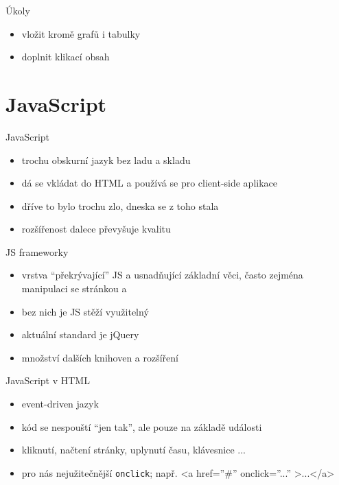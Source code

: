 \documentclass{beamer}
\begin{document}
\begin{frame}{Úkoly}
  \begin{itemize}
    \item vložit kromě grafů i tabulky
    \item doplnit klikací obsah
  \end{itemize}
\end{frame}


\section{JavaScript}

\begin{frame}{JavaScript}
  \begin{itemize}
    \item trochu obskurní jazyk bez ladu a skladu
    \item dá se vkládat do HTML a používá se pro client-side aplikace
    \item dříve to bylo trochu zlo, dneska se z toho stala
    \item rozšířenost dalece převyšuje kvalitu
  \end{itemize}
\end{frame}

\begin{frame}{JS frameworky}
  \begin{itemize}
    \item vrstva ``překrývající'' JS a usnadňující základní věci, často zejména manipulaci se stránkou a
    \item bez nich je JS stěží využitelný
    \item aktuální standard je jQuery
    \item množství dalších knihoven a rozšíření
  \end{itemize}
\end{frame}

\begin{frame}{JavaScript v HTML}
  \begin{itemize}
    \item event-driven jazyk
    \item kód se nespouští ``jen tak'', ale pouze na základě události
    \item kliknutí, načtení stránky, uplynutí času, klávesnice ...
    \item pro nás nejužitečnější \texttt{onclick}; např. <a href=''\#'' onclick=''...'' >...</a>
  \end{itemize}
\end{frame}
\end{document}
